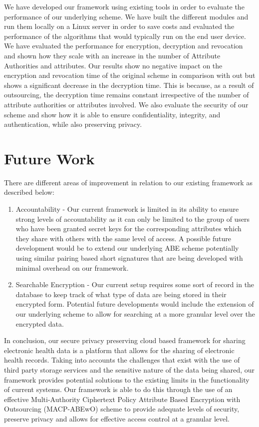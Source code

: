 We have developed our framework using existing tools in order to evaluate the performance of our underlying scheme. We have built the different modules and run them locally on a Linux server in order to save costs and evaluated the performance of the algorithms that would typically run on the end user device. We have evaluated the performance for encryption, decryption and revocation and shown how they scale with an increase in the number of Attribute Authorities and attributes. Our results show no negative impact on the encryption and revocation time of the original scheme in comparison with out but shows a significant decrease in the decryption time. This is because, as a result of outsourcing, the decryption time remains constant irrespective of the number of attribute authorities or attributes involved. We also evaluate the security of our scheme and show how it is able to ensure confidentiality, integrity, and authentication, while also preserving privacy.

\section{Future Work}

There are different areas of improvement in relation to our existing framework as described below:

\begin{enumerate}[label=(\arabic*)]
	\item Accountability - Our current framework is limited in its ability to ensure strong levels of accountability as it can only be limited to the group of users who have been granted secret keys for the corresponding attributes which they share with others with the same level of access. A possible future development would be to extend our underlying ABE scheme potentially using similar pairing based short signatures that are being developed with minimal overhead on our framework.
	
	\item Searchable Encryption - Our current setup requires some sort of record in the database to keep track of what type of data are being stored in their encrypted form. Potential future developments would include the extension of our underlying scheme to allow for searching at a more granular level over the encrypted data.
	
\end{enumerate}

In conclusion, our secure privacy preserving cloud based framework for sharing electronic health data is a platform that allows for the sharing of electronic health records. Taking into accounts the challenges that exist with the use of third party storage services and the sensitive nature of the data being shared, our framework provides potential solutions to the existing limits in the functionality of current systems. Our framework is able to do this through the use of an effective Multi-Authority Ciphertext Policy Attribute Based Encryption with Outsourcing (MACP-ABEwO) scheme to provide adequate levels of security, preserve privacy and allows for effective access control at a granular level. 
